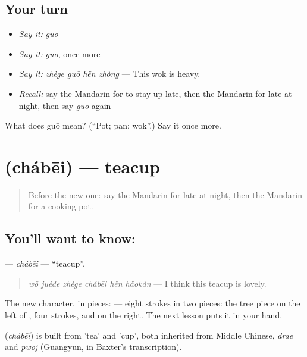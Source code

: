 \subsection*{Your turn}
\begin{itemize}
\raggedright
  \item \emph{Say it:} \emph{guō}
  \item \emph{Say it:} \emph{guō}, once more
  \item \emph{Say it:} \emph{zhège guō hěn zhòng} — This wok is heavy.
  \item \emph{Recall:} say the Mandarin for to stay up late, then the Mandarin for late at night, then say \emph{guō} again
\end{itemize}

\begin{tcolorbox}[breakable,colback=teal!4,colframe=teal!35!black,title={Before you move on}]
What does guō mean? (\textquotedblleft{}Pot; pan; wok\textquotedblright{}.) Say it once more.
\end{tcolorbox}
\section[\texorpdfstring{\zh{茶杯} (chábēi)}{茶杯 (chábēi)}]{ (chábēi) — teacup}

\label{lesson:ZH-C170-chabei}



\begin{quote}
Before the new one: say the Mandarin for late at night, then the Mandarin for a cooking pot.
\end{quote}

\subsection*{You'll want to know: }
\textbf{} — \emph{chábēi} — \textquotedblleft{}teacup\textquotedblright{}.

\begin{quote}
\textbf{} \emph{wǒ juéde zhège chábēi hěn hǎokàn} — I think this teacup is lovely.
\end{quote}

The new character, in pieces:  — eight strokes in two pieces: the tree piece on the left of , four strokes, and  on the right. The next lesson puts it in your hand.

\begin{cousinweb}
\textbf{} (\emph{chábēi}) is built from  'tea' and  'cup', both inherited from Middle Chinese, \emph{drae} and \emph{pwoj} (Guangyun, in Baxter's transcription).
\end{cousinweb}

